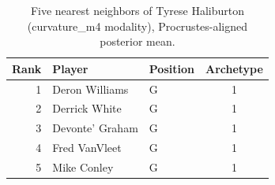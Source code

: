\begin{table}[htbp]
  \centering\small
  \begin{tabular}{rllc}
    \toprule
    Rank & Player & Position & Archetype \\
    \midrule
    1 & Deron Williams & G & 1 \\
    2 & Derrick White & G & 1 \\
    3 & Devonte' Graham & G & 1 \\
    4 & Fred VanVleet & G & 1 \\
    5 & Mike Conley & G & 1 \\
    \bottomrule
  \end{tabular}
  \caption{Five nearest neighbors of Tyrese Haliburton (curvature_m4 modality), Procrustes-aligned posterior mean.}
  \label{tab:Tyrese_Haliburton_neighbors_curvature_m4}
\end{table}

